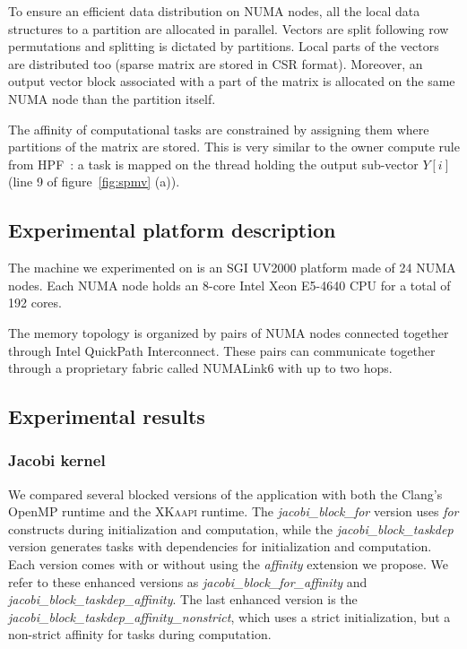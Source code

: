 \documentclass{Styles/llncs}
\newcommand{\kaapi}{\textsc{\mbox{XKaapi}}\xspace}
\begin{document}
To ensure an efficient data distribution on NUMA nodes, all the local data structures to a partition are allocated in parallel. Vectors are split following row permutations and splitting is dictated by partitions. Local parts of the vectors are distributed too (sparse matrix are stored in CSR format). Moreover, an output vector block associated with a part of the matrix is allocated on the same NUMA node than the partition itself.

The affinity of computational tasks are constrained by assigning them where partitions of the matrix are stored. This is very similar to the owner compute rule from HPF~\cite{HPF}: a task is mapped on the thread holding the output sub-vector $Y[i]$ (line 9 of figure~\ref{fig:spmv} (a)).

\subsection{Experimental platform description}
\label{sec:idchire}

The machine we experimented on is an SGI UV2000 platform made of 24 NUMA nodes.
Each NUMA node holds an 8-core Intel Xeon E5-4640 CPU for a total of 192 cores.

The memory topology is organized by pairs of NUMA nodes connected together through Intel QuickPath Interconnect.
These pairs can communicate together through a proprietary fabric called NUMALink6 with up to two hops.

\subsection{Experimental results}
\label{sec:experiment}

\subsubsection{Jacobi kernel}

We compared several blocked versions of the application with both the Clang's OpenMP runtime
and the \kaapi runtime. The \textit{jacobi\_block\_for} version uses \emph{for} constructs during initialization and computation, while the \textit{jacobi\_block\_taskdep} version generates tasks with dependencies for initialization and computation. Each version comes with or without using the \emph{affinity} extension we propose. We refer to these enhanced versions as \textit{jacobi\_block\_for\_affinity} and \textit{jacobi\_block\_taskdep\_affinity}. The last enhanced version is the
\textit{jacobi\_block\_taskdep\_affinity\_nonstrict}, which uses a strict initialization, but a non-strict affinity for tasks during computation.
\end{document}
